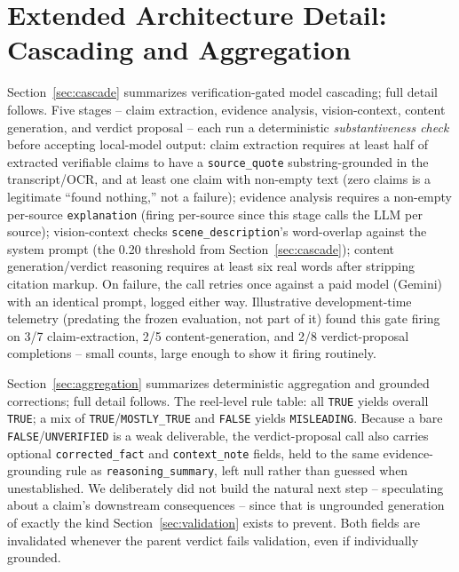 \documentclass[conference]{IEEEtran}
\begin{document}
\appendix

\section{Extended Architecture Detail: Cascading and Aggregation}
\label{sec:appendixarchitecture}
Section~\ref{sec:cascade} summarizes verification-gated model cascading;
full detail follows. Five stages -- claim extraction, evidence analysis,
vision-context, content generation, and verdict proposal -- each run a
deterministic \emph{substantiveness check} before accepting local-model
output: claim extraction requires at least half of extracted verifiable
claims to have a \texttt{source\_quote} substring-grounded in the
transcript/OCR, and at least one claim with non-empty text (zero claims
is a legitimate ``found nothing,'' not a failure); evidence analysis
requires a non-empty per-source \texttt{explanation} (firing per-source
since this stage calls the LLM per source); vision-context checks
\texttt{scene\_description}'s word-overlap against the system prompt (the
0.20 threshold from Section~\ref{sec:cascade}); content
generation/verdict reasoning requires at least six real words after
stripping citation markup. On failure, the call retries once against a
paid model (Gemini) with an identical prompt, logged either way.
Illustrative development-time telemetry (predating the frozen evaluation,
not part of it) found this gate firing on 3/7 claim-extraction, 2/5
content-generation, and 2/8 verdict-proposal completions -- small counts,
large enough to show it firing routinely.

Section~\ref{sec:aggregation} summarizes deterministic aggregation and
grounded corrections; full detail follows. The reel-level rule table:
all \texttt{TRUE} yields overall \texttt{TRUE}; a mix of
\texttt{TRUE}/\texttt{MOSTLY\_TRUE} and \texttt{FALSE} yields
\texttt{MISLEADING}. Because a bare \texttt{FALSE}/\texttt{UNVERIFIED} is
a weak deliverable, the verdict-proposal call also carries optional
\texttt{corrected\_fact} and \texttt{context\_note} fields, held to the
same evidence-grounding rule as \texttt{reasoning\_summary}, left null
rather than guessed when unestablished. We deliberately did not build the
natural next step -- speculating about a claim's downstream consequences
-- since that is ungrounded generation of exactly the kind
Section~\ref{sec:validation} exists to prevent. Both fields are
invalidated whenever the parent verdict fails validation, even if
individually grounded.
\end{document}
